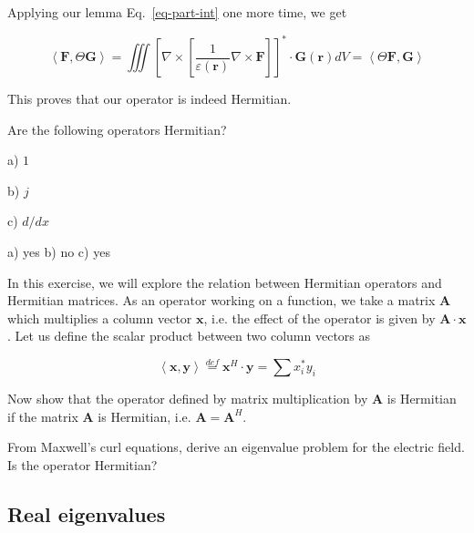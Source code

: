 Applying our lemma Eq.~\ref{eq-part-int} one more time, we get

\begin{equation}
\left\langle {\mathbf F}, \Theta {\mathbf G}\right\rangle = \iiint \left[ \nabla \times  \left [\frac{1}{\varepsilon({\mathbf r})} \nabla \times {\mathbf F}\right] \right ] ^* \cdot {\mathbf G({\mathbf r})}  dV  = \left\langle \Theta {\mathbf F}, {\mathbf G}\right\rangle 
\end{equation} 

This proves that our operator is indeed Hermitian.

\begin{exer}
Are the following operators Hermitian?

a) $1$
  
b) $j$
  
c) $d/dx$

\begin{sol}
a) yes b) no c) yes
\end{sol}
\end{exer}

\begin{exer}
In this exercise, we will explore the relation between Hermitian operators and Hermitian matrices. As an operator working on a function, we take a matrix ${\mathbf A}$ which multiplies a column vector ${\mathbf x}$, i.e. the effect of the operator is given by ${\mathbf A} \cdot {\mathbf x}$. Let us define the scalar product between two column vectors as

$$\left\langle {\mathbf x},{\mathbf y} \right\rangle \stackrel{def}{=} {\mathbf x}^H \cdot {\mathbf y} = \sum{x_i^* y_i}$$

Now show that the operator defined by matrix multiplication by ${\mathbf A}$ is Hermitian if the matrix ${\mathbf A}$ is Hermitian, i.e. ${\mathbf A} = {\mathbf A}^H$.
\end{exer}


\begin{exer}
From Maxwell's curl equations, derive an eigenvalue problem for the electric field. Is the operator Hermitian?
\end{exer}

\pagebreak


\subsection{Real eigenvalues}

